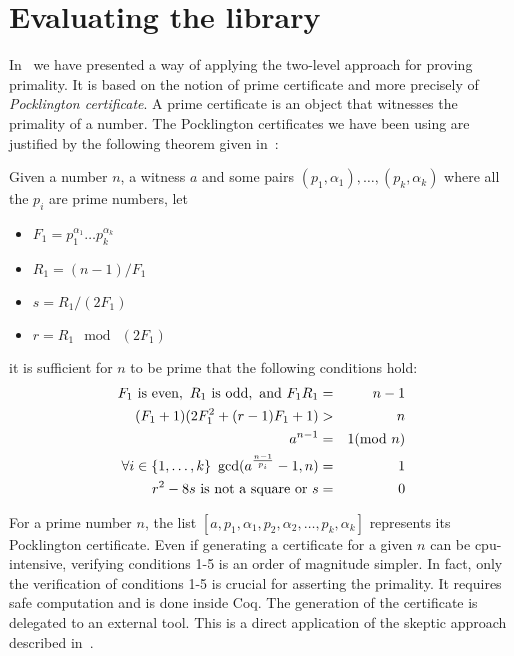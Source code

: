 \section{Evaluating the library \label{bench}}

In~\cite{GreTheWer} we have presented a way of applying 
the two-level approach for proving primality. It is based on the
notion of prime certificate and more 
precisely of {\it Pocklington certificate}.
A prime certificate is an object that witnesses the primality of a number.
The Pocklington certificates we have been using are justified by the following
theorem given in~\cite{lehmer}:
\begin{theorem}\label{lehmer}
Given a number $n$, a witness $a$ and some pairs 
$(p_1,\alpha_1),\dots,(p_k,\alpha_k)$
 where all the $p_i$ are prime numbers,
 let
 \begin{itemize}
\item[]$F_1 = p_1^{\alpha_1}\dots p_k^{\alpha_k}$
\item[]$R_1 = (n - 1) / F_1$
\item[]$ s = R_1 / (2F_1)$
\item[] $r = R_1 \mod\ (2F_1)$
 \end{itemize}
 it is sufficient for $n$ to be prime that the following conditions hold:
\begin{eqnarray}
F_1 \,\,\hbox{is even},\,\,
R_1 \,\, \hbox{is odd}, \,\,\hbox{and}\,\,
F_1R_1  &=&  n -1\\
(F_1 + 1) (2F_1^2 + (r - 1) F_1 + 1) & >& n\\
a^{n-1} &=& 1 (\mod\ n)\\
\forall i\in\{1,\dots,k\}~\gcd(a^{\frac{n-1}{p_i}}-1,n)&=&1\\
r^2 - 8 s\,\,\mbox{is not a square}\,\,\hbox{or}\,\,s &=& 0
\end{eqnarray}
\end{theorem}
For a prime number $n$, the list 
$[a, p_1, \alpha_1, p_2, \alpha_2, \dots, p_k, \alpha_k]$
represents its Pocklington certificate.
Even if generating a certificate for a given $n$ can be cpu-intensive, 
verifying conditions 1-5 is an order of magnitude simpler. In fact, only
the verification of conditions 1-5 is crucial for asserting the primality. 
It requires safe computation and is done inside {\sc Coq}.
The generation of the certificate is delegated to an external tool.
This is a direct application of the skeptic approach described 
in~\cite{BarBar,HarThe}.
                 
